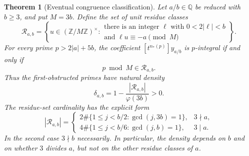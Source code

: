 \documentclass[11pt,a4paper,reqno]{amsart}
\newtheorem{theorem}{Theorem}[section]
\theoremstyle{definition}
\theoremstyle{remark}
\newcommand{\Q}{\mathbb Q}
\newcommand{\Z}{\mathbb Z}
\begin{document}
\begin{theorem}[Eventual congruence classification]\label{thm:residue-sieve}
Let $a/b\in\Q$ be reduced with $b\ge3$, and put $M=3b$.
Define the set of unit residue classes
\[
 \mathcal R_{a,b}=\left\{u\in(\Z/M\Z)^\times:
   \begin{array}{l}
   \text{there is an integer }\ell\text{ with }0<2|\ell|<b\\[-1mm]
   \text{and }\ell u\equiv-a\pmod M
   \end{array}\right\}.
\]
For every prime $p>2|a|+5b$, the coefficient
$[t^{n_*(p)}]y_{a/b}$ is $p$-integral if and only if
\[
                 p\bmod M\in\mathcal R_{a,b}.
\]
Thus the first-obstructed primes have natural density
\begin{equation}\label{eq:delta}
 \delta_{a,b}=1-\frac{|\mathcal R_{a,b}|}{\varphi(3b)}>0.
\end{equation}
The residue-set cardinality has the explicit form
\begin{equation}\label{eq:residue-count}
 |\mathcal R_{a,b}|=
 \begin{cases}
 2\#\{1\le j<b/2:\gcd(j,3b)=1\},&3\nmid a,\\[1mm]
 4\#\{1\le j<b/6:\gcd(j,b)=1\},&3\mid a.
 \end{cases}
\end{equation}
In the second case $3\nmid b$ necessarily. In particular, the
density depends on $b$ and on whether $3$ divides $a$, but not
on the other residue classes of $a$.
\end{theorem}
\end{document}

